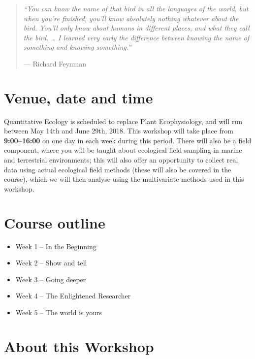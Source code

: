 \documentclass[english,10pt,a4paper,oneside]{book}
\providecommand{\tightlist}{%
  \setlength{\itemsep}{0pt}\setlength{\parskip}{0pt}}
\theoremstyle{definition}
\theoremstyle{definition}
\theoremstyle{definition}
\theoremstyle{remark}
\begin{document}
\begin{quote}
\emph{\enquote{You can know the name of that bird in all the languages
of the world, but when you're finished, you'll know absolutely nothing
whatever about the bird. You'll only know about humans in different
places, and what they call the bird. \ldots{} I learned very early the
difference between knowing the name of something and knowing
something.}}

--- Richard Feynman
\end{quote}

\section*{Venue, date and time}\label{venue-date-and-time}

Quantitative Ecology is scheduled to replace Plant Ecophysiology, and
will run between May 14th and June 29th, 2018. This workshop will take
place from \textbf{9:00--16:00} on one day in each week during this
period. There will also be a field component, where you will be taught
about ecological field sampling in marine and terrestrial environments;
this will also offer an opportunity to collect real data using actual
ecological field methods (these will also be covered in the course),
which we will then analyse using the multivariate methods used in this
workshop.

\section*{Course outline}\label{course-outline}

\begin{itemize}
\tightlist
\item
  Week 1 -- In the Beginning
\item
  Week 2 -- Show and tell
\item
  Week 3 -- Going deeper
\item
  Week 4 -- The Enlightened Researcher
\item
  Week 5 -- The world is yours
\end{itemize}

\section*{About this Workshop}\label{about-this-workshop}
\end{document}
